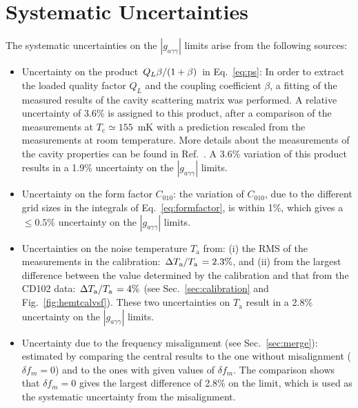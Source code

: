 \documentclass[%
reprint, %
superscriptaddress,
 amsmath,amssymb,
 aps
]{revtex4-2}
\begin{document}
\section{Systematic Uncertainties} \label{sec:sys}
The systematic uncertainties on the $\left|g_{a\gamma\gamma}\right|$ limits 
arise from the following sources:
\begin{itemize}
\item Uncertainty on the product 
$\left.Q_L\beta\middle/\left(1+\beta\right)\right.$ in Eq.~\eqref{eq:ps}: 
In order to extract the loaded quality factor $Q_L$ and the coupling 
coefficient $\beta$, a fitting of the measured results of the cavity 
scattering matrix was performed. A relative uncertainty of 3.6\% is 
assigned to this product, after a comparison of the measurements at 
$T_\text{c}\simeq155$~mK with a prediction rescaled from the measurements 
at room temperature. More details about the measurements of the 
cavity properties can be found in Ref.~\cite{TASEHInstrumentation}. 
A 3.6\% variation of this product results in a 1.9\% uncertainty 
on the $\left|g_{a\gamma\gamma}\right|$ limits. 

\item Uncertainty on the form factor $C_{010}$: 
the variation of $C_{010}$, due to the different grid sizes in the integrals 
of Eq.~\eqref{eq:formfactor}, is within 1\%, which gives a $\leq 0.5$\% 
uncertainty on the $\left|g_{a\gamma\gamma}\right|$ limits.

\item Uncertainties on the noise temperature $T_\text{a}$ from: (i) the RMS of 
the measurements in the calibration: 
$\left. \Delta T_\text{a}\middle/T_\text{a}\right.= 2.3\%$,  
and (ii) from the largest difference 
between the value determined by the calibration and that from the CD102 
data: $\left. \Delta T_\text{a}\middle/T_\text{a}\right.= 4\%$ 
(see Sec.~\ref{sec:calibration} and Fig.~\ref{fig:hemtcalvsf}). 
These two uncertainties on $T_\text{a}$ result in a 2.8\% uncertainty 
on the $\left|g_{a\gamma\gamma}\right|$ limits. 


\item Uncertainty due to the frequency misalignment (see Sec.~\ref{sec:merge}):
  estimated by comparing the central results to the one without misalignment
  ($\delta f_m = 0$)
  and to the ones with given values of $\delta f_m$.
  The comparison shows that $\delta f_m = 0$ gives the largest difference 
  of 2.8\% on the limit, which is used as the systematic uncertainty from the 
  misalignment.
  

\end{itemize}
\end{document}
